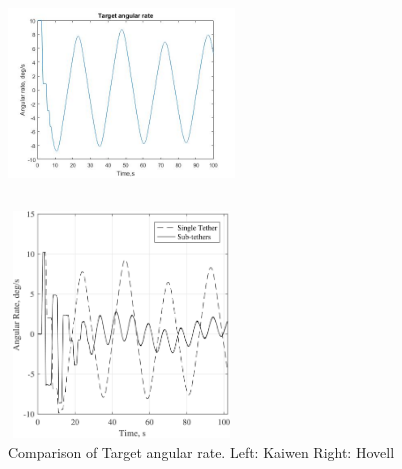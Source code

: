 \begin{figure}[htbp]
\centering
\begin{minipage}[t]{0.48\textwidth}
\centering
\includegraphics[width=6cm,height=6cm]{fig/simulation/ThrustStable/Targetangularrate.jpg}
\end{minipage}
\begin{minipage}[t]{0.48\textwidth}
\centering
\includegraphics[width=6cm,height=6cm]{fig/simulation/ThrustStable/Targetangularratesample.jpg}
\end{minipage}
\caption{Comparison of Target angular rate.		Left: Kaiwen	Right: Hovell}
\end{figure}

